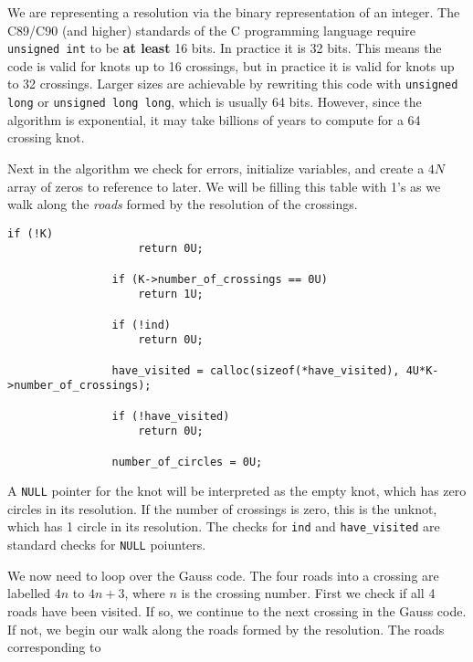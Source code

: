 \documentclass{article}
\theoremstyle{plain}
\begin{document}
        We are representing a resolution via the binary representation of an
        integer. The C89/C90 (and higher) standards of the C programming
        language require \texttt{unsigned int} to be \textbf{at least} 16 bits.
        In practice it is 32 bits. This means the code is valid for knots up
        to 16 crossings, but in practice it is valid for knots up to 32
        crossings. Larger sizes are achievable by rewriting this code with
        \texttt{unsigned long} or \texttt{unsigned long long}, which is usually
        64 bits. However, since the algorithm is exponential, it may take
        billions of years to compute for a 64 crossing knot.
        \par\hfill\par
        Next in the algorithm we check for errors, initialize variables, and
        create a $4N$ array of zeros to reference to later. We will be filling
        this table with 1's as we walk along the \textit{roads} formed by the
        resolution of the crossings.
        \begin{lstlisting}[style=CStyle, gobble=12]
                if (!K)
                    return 0U;

                if (K->number_of_crossings == 0U)
                    return 1U;

                if (!ind)
                    return 0U;

                have_visited = calloc(sizeof(*have_visited), 4U*K->number_of_crossings);

                if (!have_visited)
                    return 0U;

                number_of_circles = 0U;
        \end{lstlisting}
        A \texttt{NULL} pointer for the knot will be interpreted as the empty
        knot, which has zero circles in its resolution. If the number of
        crossings is zero, this is the unknot, which has 1 circle in its
        resolution. The checks for \texttt{ind} and
        \texttt{have\_visited} are standard checks for \texttt{NULL} poiunters.
        \par\hfill\par
        We now need to loop over the Gauss code. The four roads into a crossing
        are labelled $4n$ to $4n+3$, where $n$ is the crossing number. First we
        check if all 4 roads have been visited. If so, we continue to the next
        crossing in the Gauss code. If not, we begin our walk along the roads
        formed by the resolution. The roads corresponding to
\end{document}
